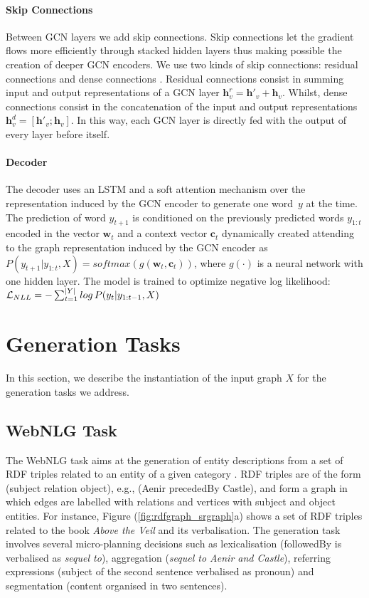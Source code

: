 \documentclass[11pt,a4paper,dvipsnames]{article}
\newcommand{\nl}[1]{\textit{{\small #1}}}
\begin{document}
\paragraph{Skip Connections} Between GCN layers we add skip connections.
Skip connections let the gradient flows more efficiently through stacked hidden layers thus making possible the creation of deeper GCN encoders.
We use two kinds of skip connections: residual connections \cite{he2016deep} and dense connections \cite{DBLP:conf/cvpr/HuangLMW17}.
Residual connections consist in summing input and output representations of a GCN layer 
$\mathbf{h}^r_v \!=\! \mathbf{h}'_v \! + \! \mathbf{h}_v$.
Whilst, dense connections consist in the concatenation of the input and output representations $\mathbf{h}^d_v = [\mathbf{h}'_v;\mathbf{h}_v]$.
In this way, each GCN layer is directly fed with the output of every layer before itself.

\vspace*{-0.5ex}
\paragraph{Decoder}
The decoder uses an LSTM and a soft attention mechanism \cite{luong2015effective} over the representation induced by the GCN encoder to generate one word~$y$ at the time.
The prediction of word $y_{t+1}$ is conditioned on the previously predicted words $y_{1:t}$ encoded in the vector $\mathbf{w}_t$ and a context vector $\mathbf{c}_t$
dynamically created attending to the graph representation induced by the GCN encoder as
$ P(y_{t+1}|y_{1:t}, X) = softmax(g(\mathbf{w}_t, \mathbf{c}_t))$,
where $g(\cdot)$ is a neural network with one hidden layer.
The model is trained to optimize negative log likelihood:
${\cal L}_{NLL} =  - \sum_{t=1}^{|Y|} log \, P(y_t|y_{1:t-1}, X)$

\section{Generation Tasks}
\label{sec:d2ttasks}
In this section, we describe the instantiation of the input graph $X$
for the generation tasks we address.


\subsection{WebNLG Task}
The WebNLG task \cite{gardent-EtAl:2017:Long,gardent-EtAl:2017:INLG2017} 
aims at the generation of entity descriptions from a set of RDF triples 
related to an entity of a given category \cite{perezbeltrachini-sayed-gardent:2016:COLING}. 
RDF triples are of the form ({\sffamily subject relation object}), e.g.,
({\sffamily Aenir precededBy Castle}), and form a graph in which edges are 
labelled with relations and vertices with subject and object entities.
For instance, Figure (\ref{fig:rdfgraph_srgraph}a) shows a set of RDF 
triples related to the book \emph{Above the Veil} and its verbalisation.
The generation task involves several micro-planning decisions such as lexicalisation ({\sffamily followedBy}
is verbalised as \nl{sequel to}), aggregation (\nl{sequel to Aenir and Castle}),
referring expressions (subject of the second sentence verbalised as pronoun)
and segmentation (content organised in two sentences).
\end{document}
